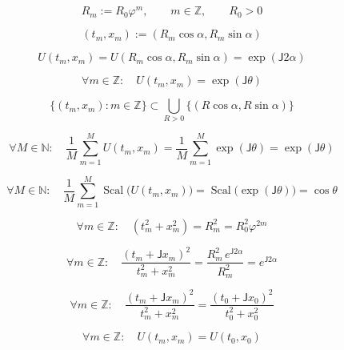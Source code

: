 \documentclass[12pt]{article}
\begin{document}
\begin{equation}
R_m:=R_0\varphi^m,\qquad m\in\mathbb{Z},\qquad R_0>0
\end{equation}

\begin{equation}
(t_m,x_m):=(R_m\cos\alpha,R_m\sin\alpha)
\end{equation}

\begin{equation}
U(t_m,x_m)=U(R_m\cos\alpha,R_m\sin\alpha)=\exp(\mathsf{J}2\alpha)
\end{equation}

\begin{equation}
\forall m\in\mathbb{Z}:\quad U(t_m,x_m)=\exp(\mathsf{J}\theta)
\end{equation}

\begin{equation}
\bigl\{(t_m,x_m):m\in\mathbb{Z}\bigr\}\subset \bigcup_{R>0}\bigl\{(R\cos\alpha,R\sin\alpha)\bigr\}
\end{equation}

\begin{equation}
\forall M\in\mathbb{N}:\quad \frac{1}{M}\sum_{m=1}^M U(t_m,x_m)=\frac{1}{M}\sum_{m=1}^M \exp(\mathsf{J}\theta)=\exp(\mathsf{J}\theta)
\end{equation}

\begin{equation}
\forall M\in\mathbb{N}:\quad \frac{1}{M}\sum_{m=1}^M \operatorname{Scal}\!\big(U(t_m,x_m)\big)=\operatorname{Scal}\!\big(\exp(\mathsf{J}\theta)\big)=\cos\theta
\end{equation}

\begin{equation}
\forall m\in\mathbb{Z}:\quad (t_m^2+x_m^2)=R_m^2=R_0^2\varphi^{2m}
\end{equation}

\begin{equation}
\forall m\in\mathbb{Z}:\quad \frac{(t_m+\mathsf{J}x_m)^2}{t_m^2+x_m^2}=\frac{R_m^2\,e^{\mathsf{J}2\alpha}}{R_m^2}=e^{\mathsf{J}2\alpha}
\end{equation}

\begin{equation}
\forall m\in\mathbb{Z}:\quad \frac{(t_m+\mathsf{J}x_m)^2}{t_m^2+x_m^2}=\frac{(t_0+\mathsf{J}x_0)^2}{t_0^2+x_0^2}
\end{equation}

\begin{equation}
\forall m\in\mathbb{Z}:\quad U(t_m,x_m)=U(t_0,x_0)
\end{equation}
\end{document}

